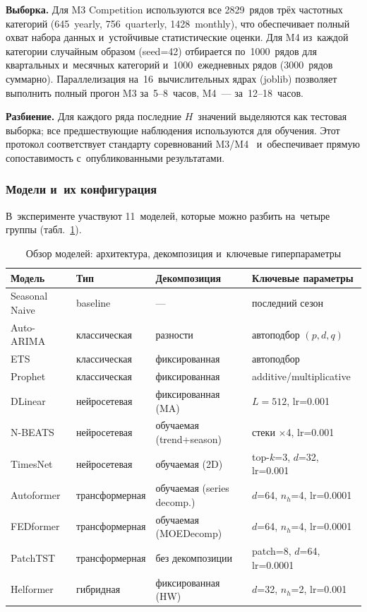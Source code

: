 \textbf{Выборка.} Для M3 Competition используются все 2829~рядов
трёх частотных категорий (645~yearly, 756~quarterly, 1428~monthly),
что обеспечивает полный охват набора данных и~устойчивые
статистические оценки. Для M4 из~каждой категории случайным образом
(seed=42) отбирается по~1000~рядов для квартальных и~месячных
категорий и~1000~ежедневных рядов (3000~рядов суммарно).
Параллелизация на~16~вычислительных ядрах (joblib) позволяет выполнить
полный прогон M3 за~5--8~часов, M4~--- за~12--18~часов.

\textbf{Разбиение.} Для каждого ряда последние $H$~значений
выделяются как тестовая выборка; все предшествующие наблюдения
используются для обучения. Этот протокол соответствует стандарту
соревнований M3/M4~\cite{makridakis2000m3, makridakis2020m4}
и~обеспечивает прямую сопоставимость с~опубликованными результатами.

\subsubsection{Модели и~их конфигурация}
\label{sssec:models}

В~эксперименте участвуют 11~моделей, которые можно разбить на~четыре
группы (табл.~\ref{tab:model-overview}).

\begin{table}[H]
\centering
\caption{Обзор моделей: архитектура, декомпозиция и~ключевые гиперпараметры}
\label{tab:model-overview}
\small
\begin{tabular}{@{}llll@{}}
\toprule
Модель & Тип & Декомпозиция & Ключевые параметры \\
\midrule
Seasonal Naive & baseline & --- & последний сезон \\
Auto-ARIMA     & классическая & разности & автоподбор $(p,d,q)$ \\
ETS            & классическая & фиксированная & автоподбор \\
Prophet        & классическая & фиксированная & additive/multiplicative \\
\midrule
DLinear        & нейросетевая & фиксированная (MA) & $L{=}512$, lr=0.001 \\
N-BEATS        & нейросетевая & обучаемая (trend+season) & стеки $\times$4, lr=0.001 \\
TimesNet       & нейросетевая & обучаемая (2D) & top-$k$=3, $d$=32, lr=0.001 \\
\midrule
Autoformer     & трансформерная & обучаемая (series decomp.) & $d$=64, $n_h$=4, lr=0.0001 \\
FEDformer      & трансформерная & обучаемая (MOEDecomp) & $d$=64, $n_h$=4, lr=0.0001 \\
PatchTST       & трансформерная & без декомпозиции & patch=8, $d$=64, lr=0.0001 \\
\midrule
Helformer      & гибридная & фиксированная (HW) & $d$=32, $n_h$=2, lr=0.001 \\
\bottomrule
\end{tabular}
\end{table}

